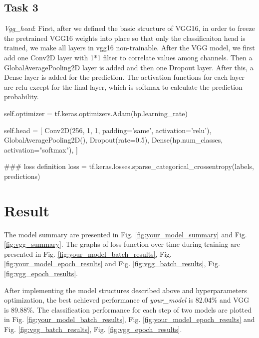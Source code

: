 \subsection*{Task 3}

\emph{Vgg\_head}: First, after we defined the basic structure of VGG16, in order to freeze the pretrained VGG16 weights into place so that only the classificaiton head is trained, we make all layers in vgg16 non-trainable. After the VGG model, we first add one Conv2D layer with 1*1 filter to correlate values among channels. Then a GlobalAveragePooling2D layer is added and then one Dropout layer. After this, a Dense layer is added for the prediction. The activation functions for each layer are relu except for the final layer, which is softmax to calculate the prediction probability.
    \begin{python}
self.optimizer = tf.keras.optimizers.Adam(hp.learning_rate)

self.head = [
    Conv2D(256, 1, 1, padding='same', activation='relu'),
    GlobalAveragePooling2D(),
    Dropout(rate=0.5),
    Dense(hp.num_classes, activation="softmax"),
  ]
  
### loss definition
loss = tf.keras.losses.sparse_categorical_crossentropy(labels, predictions)
    \end{python}

\section*{Result}

The model summary are presented in Fig. \ref{fig:your_model_summary} and Fig. \ref{fig:vgg_summary}. The graphs of loss function over time during training are presented in Fig. \ref{fig:your_model_batch_results}, Fig. \ref{fig:your_model_epoch_results} and Fig. \ref{fig:vgg_batch_results}, Fig. \ref{fig:vgg_epoch_results}.

After implementing the model structures described above and hyperparameters optimization, the best achieved performance of \emph{your\_model} is 82.04\% and VGG is 89.88\%. The classification performance for each step of two models are plotted in Fig. \ref{fig:your_model_batch_results}, Fig. \ref{fig:your_model_epoch_results} and Fig. \ref{fig:vgg_batch_results}, Fig. \ref{fig:vgg_epoch_results}.

